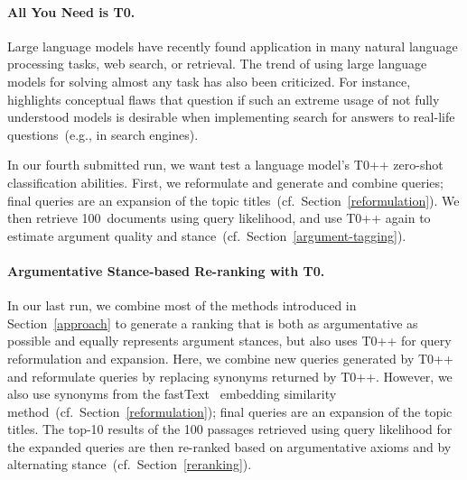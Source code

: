 \paragraph{All You Need is T0.}

Large language models have recently found application in many natural language processing tasks, web search, or retrieval. The trend of using large language models for solving almost any task has also been criticized. For instance, \citet{ShahB2022} highlights conceptual flaws that question if such an extreme usage of not fully understood models is desirable when implementing search for answers to real-life questions~(e.g., in search engines).

In our fourth submitted run, we want test a language model's T0++ zero-shot classification abilities. First, we reformulate and generate and combine queries; final queries are an expansion of the topic titles~(cf.\ Section~\ref{reformulation}).
We then retrieve 100~documents using query likelihood, and use T0++ again to estimate argument quality and stance~(cf.\ Section~\ref{argument-tagging}).

\paragraph{Argumentative Stance-based Re-ranking with T0.}

In our last run, we combine most of the methods introduced in Section~\ref{approach} to generate a ranking that is both as argumentative as possible and equally represents argument stances, but also uses T0++ for query reformulation and expansion.
Here, we combine new queries generated by T0++ and reformulate queries by replacing synonyms returned by T0++. However, we also use synonyms from the fastText~\cite{BojanowskiGJM2017} embedding similarity method~(cf.\ Section~\ref{reformulation}); final queries are an expansion of the topic titles.
The top-10 results of the 100 passages retrieved using query likelihood for the expanded queries are then re-ranked based on argumentative axioms and by alternating stance~(cf.\ Section~\ref{reranking}).
